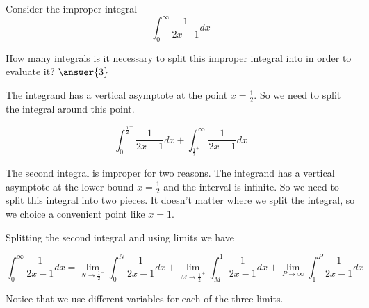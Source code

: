 \documentclass{ximera}
\author{Jason Miller}
\begin{document}
\begin{exercise}
Consider the improper integral 
\[
\int_{0}^{\infty} \frac{1}{2x-1} dx
\]

How many integrals is it necessary to split this improper integral into in order to evaluate it? $\answer{3}$


\begin{feedback}[correct]
 The integrand has a vertical asymptote at the point $x=\frac{1}{2}$. So we need to split the integral around this point. 

\[
\int_{0}^{{\frac{1}{2}}^{-}} \frac{1}{2x-1} dx + \int_{{\frac{1}{2}}^{+}}^{\infty} \frac{1}{2x-1} dx 
\]

The second integral is improper for two reasons. The integrand has a vertical asymptote at the lower bound $x=\frac{1}{2}$ and the interval is infinite. So we need to split this integral into two pieces. It doesn't matter where we split the integral, so we choice a convenient point like $x=1$. 

Splitting the second integral and using limits we have

\[
\int_{0}^{\infty} \frac{1}{2x-1} dx= \lim_{N \to {\frac{1}{2}}^{-}} \int_{0}^{N} \frac{1}{2x-1} dx +
\lim_{M \to {\frac{1}{2}}^{+}} \int_{M}^{1} \frac{1}{2x-1} dx + \lim_{P \to \infty} \int_{1}^{P} \frac{1}{2x-1} dx
\]

Notice that we use different variables for each of the three limits.

\end{feedback} 
\end{exercise}
\end{document}
